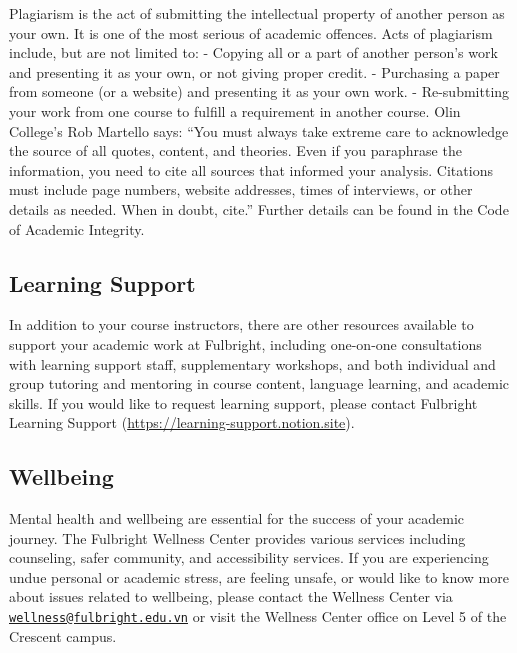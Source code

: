 \documentclass[
]{article}
\begin{document}
Plagiarism is the act of submitting the intellectual property of another person as your own.
It is one of the most serious of academic offences. Acts of plagiarism include, but are not
limited to:
- Copying all or a part of another person's work and presenting it as your own, or not
giving proper credit.
- Purchasing a paper from someone (or a website) and presenting it as your own work.
- Re-submitting your work from one course to fulfill a requirement in another course.
Olin College's Rob Martello says: ``You must always take extreme care to acknowledge the
source of all quotes, content, and theories. Even if you paraphrase the information, you need
to cite all sources that informed your analysis. Citations must include page numbers, website
addresses, times of interviews, or other details as needed. When in doubt, cite.''
Further details can be found in the Code of Academic Integrity.

\hypertarget{learning-support}{%
\subsection*{Learning Support}\label{learning-support}}

In addition to your course instructors, there are other resources available to support your
academic work at Fulbright, including one-on-one consultations with learning support staff,
supplementary workshops, and both individual and group tutoring and mentoring in course
content, language learning, and academic skills. If you would like to request learning support,
please contact Fulbright Learning Support (\url{https://learning-support.notion.site}).

\hypertarget{wellbeing}{%
\subsection*{Wellbeing}\label{wellbeing}}

Mental health and wellbeing are essential for the success of your academic journey. The
Fulbright Wellness Center provides various services including counseling, safer community,
and accessibility services. If you are experiencing undue personal or academic stress, are
feeling unsafe, or would like to know more about issues related to wellbeing, please contact
the Wellness Center via \href{mailto:wellness@fulbright.edu.vn}{\nolinkurl{wellness@fulbright.edu.vn}} or visit the Wellness Center office on
Level 5 of the Crescent campus.
\end{document}

